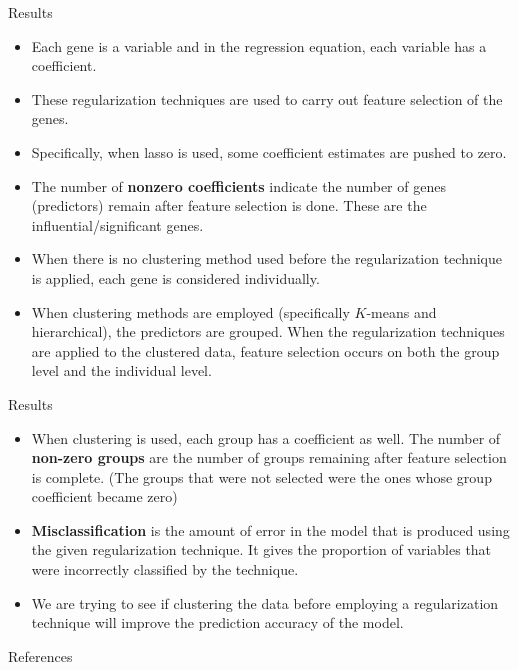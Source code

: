 \documentclass[8pt]{beamer}
\begin{document}
\begin{frame}{Results}

\begin{itemize}

\item Each gene is a variable and in the regression equation, each variable has a coefficient. 
    \item These regularization techniques are used to carry out feature selection of the genes.
    \item Specifically, when lasso is used, some coefficient estimates are pushed to zero.
    \item The number of \textbf{nonzero coefficients} indicate the number of genes (predictors) remain after feature selection is done. These are the influential/significant genes. 
    \item When there is no clustering method used before the regularization technique is applied, each gene is considered individually.
    \item When clustering methods are employed (specifically $K$-means and hierarchical), the predictors are grouped. When the regularization techniques are applied to the clustered data, feature selection occurs on both the group level and the individual level. 
    
\end{itemize}

\end{frame}


\begin{frame}{Results}

\begin{itemize}

    \item When clustering is used, each group has a coefficient as well. The number of \textbf{non-zero groups}  are the number of groups remaining after feature selection is complete. (The groups that were not selected were the ones whose group coefficient became zero)
    \item \textbf{Misclassification} is the amount of error in the model that is produced using the given regularization technique. It gives the proportion of variables that were incorrectly classified by the technique. 
    \item We are trying to see if clustering the data before employing a regularization technique will improve the prediction accuracy of the model.  
    
\end{itemize}
    
\end{frame}



\begin{frame}[allowframebreaks]{References}



    
\end{frame}
\end{document}
